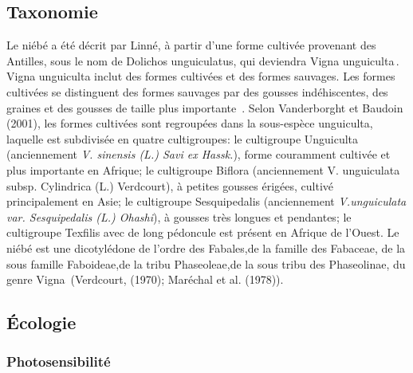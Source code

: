 \documentclass[a4paper,11pt]{article}
\begin{document}
\subsection{Taxonomie}

Le niébé a été décrit par Linné, à partir d’une forme cultivée
provenant des Antilles, sous le nom de Dolichos unguiculatus, qui
deviendra Vigna unguiculta\,\cite{Pasquet_1997}. Vigna
unguiculta inclut des formes cultivées et des formes sauvages. Les
formes cultivées se distinguent des formes sauvages par des gousses
indéhiscentes, des graines et des gousses de taille plus importante
\,\cite{Lush_1981}. Selon Vanderborght et Baudoin (2001), les
formes cultivées sont regroupées dans la sous-espèce unguiculta,
laquelle est subdivisée en quatre cultigroupes: le cultigroupe
Unguiculta (anciennement \emph{ V. sinensis (L.) Savi ex Hassk.}), forme
couramment cultivée et plus importante en Afrique; le cultigroupe
Biflora (anciennement V. unguiculata subsp. Cylindrica (L.) Verdcourt),
à petites gousses érigées, cultivé principalement en Asie; le
cultigroupe Sesquipedalis (anciennement \emph{V.unguiculata
var. Sesquipedalis (L.) Ohashi}), à gousses très longues et pendantes;
le cultigroupe Texfilis avec de long pédoncule est présent en Afrique de l’Ouest. Le
niébé est une dicotylédone de l’ordre des Fabales,de la famille des Fabaceae,
de la sous famille Faboideae,de la tribu Phaseoleae,de la sous tribu des Phaseolinae,
du genre Vigna\,\cite{Verdcourt_1970,Maréchal_1978} (Verdcourt, (1970); Maréchal et al. (1978)).

\subsection{Écologie}

\subsubsection{Photosensibilité}
\end{document}
